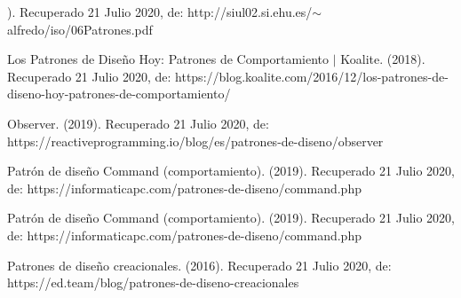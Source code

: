 \documentclass[12pt]{article}
\begin{document}
\begin{multicols}{2}
\vspace{\baselineskip}
{\fontsize{9pt}{10.8pt}). Recuperado 21 Julio 2020, de: http://siul02.si.ehu.es/$ \sim $ alfredo/iso/06Patrones.pdf \par}\par


\vspace{\baselineskip}
{\fontsize{9pt}{10.8pt}\selectfont  \par}\par

{\fontsize{9pt}{10.8pt}\selectfont Los Patrones de Diseño Hoy: Patrones de Comportamiento $ \vert $  Koalite. (2018). Recuperado 21 Julio 2020, de: https://blog.koalite.com/2016/12/los-patrones-de-diseno-hoy-patrones-de-comportamiento/ \par}\par


\vspace{\baselineskip}
{\fontsize{9pt}{10.8pt}\selectfont  \par}\par

{\fontsize{9pt}{10.8pt}\selectfont Observer. (2019). Recuperado 21 Julio 2020, de: https://reactiveprogramming.io/blog/es/patrones-de-diseno/observer \par}\par


\vspace{\baselineskip}
{\fontsize{9pt}{10.8pt}\selectfont  \par}\par


\vspace{\baselineskip}
{\fontsize{9pt}{10.8pt}\selectfont Patrón de diseño Command (comportamiento). (2019). Recuperado 21 Julio 2020, de: https://informaticapc.com/patrones-de-diseno/command.php \par}\par


\vspace{\baselineskip}

\vspace{\baselineskip}
{\fontsize{9pt}{10.8pt}\selectfont Patrón de diseño Command (comportamiento). (2019). Recuperado 21 Julio 2020, de: https://informaticapc.com/patrones-de-diseno/command.php \par}\par


\vspace{\baselineskip}
{\fontsize{9pt}{10.8pt}\selectfont Patrones de diseño creacionales. (2016). Recuperado 21 Julio 2020, de: https://ed.team/blog/patrones-de-diseno-creacionales \par}\par



\end{multicols}
\end{document}
